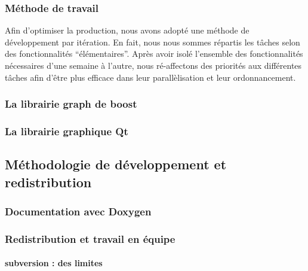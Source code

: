 \subsubsection{Méthode de travail}

Afin d'optimiser la production, nous avons adopté une méthode de développement par itération. En fait, nous nous sommes répartis les tâches selon des fonctionnalités ``élémentaires''. Après avoir isolé l'ensemble des fonctionnalités nécessaires d'une semaine à l'autre, nous ré-affectons des priorités aux différentes tâches afin d'être plus efficace dans leur parallèlisation et leur ordonnancement.

\subsubsection{La librairie graph de boost}



\subsubsection{La librairie graphique Qt}


\subsection{Méthodologie de développement et redistribution}
\subsubsection{Documentation avec Doxygen}


\subsubsection{Redistribution et travail en équipe}
\paragraph{subversion : des limites}

